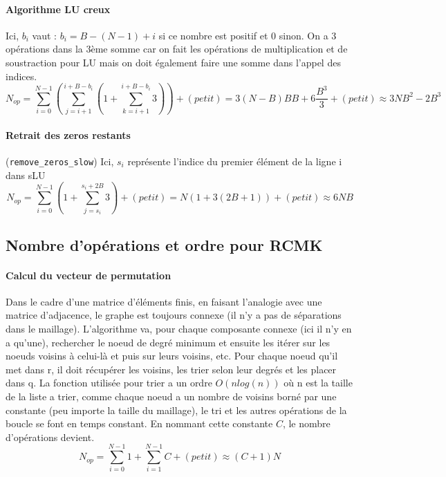 \documentclass[11pt]{article}
\begin{document}
\paragraph{Algorithme LU creux} Ici, $b_i$ vaut : $b_i = B - (N - 1) + i$ si ce nombre est positif et 0 sinon. On a 3 opérations dans la 3ème somme car on fait les opérations de multiplication et de soustraction pour LU mais on doit également faire une somme dans l'appel des indices. 
\begin{equation}
    N_{op} = \sum_{i=0}^{N-1}\left(\sum_{j=i+1}^{i + B - b_i} \left( 1 + \sum_{k=i+1}^{i + B - b_i} 3\right)\right) + (petit) = 3(N-B)B B + 6\frac{B^3}{3}+ (petit) \approx 3NB^2 -  2B^3
\end{equation}\label{eq3}
\vspace{-15pt}
\paragraph{Retrait des zeros restants} (\texttt{remove\_zeros\_slow}) Ici, $s_i$ représente l'indice du premier élément de la ligne i dans sLU
\begin{equation}
    N_{op} = \sum_{i=0}^{N-1}\left( 1 + \sum_{j = s_i}^{s_i + 2B} 3\right) + (petit) = N(1 + 3(2B+1)) + (petit) \approx 6NB
\end{equation}\label{eq4}
\vspace{-15pt}

\subsection*{Nombre d'opérations et ordre pour RCMK}
\paragraph{Calcul du vecteur de permutation} Dans le cadre d'une matrice d'éléments finis, en faisant l'analogie avec une matrice d'adjacence, le graphe est toujours connexe (il n'y a pas de séparations dans le maillage). L'algorithme va, pour chaque composante connexe (ici il n'y en a qu'une), rechercher le noeud de degré minimum et ensuite les itérer sur les noeuds voisins à celui-là et puis sur leurs voisins, etc. Pour chaque noeud qu'il met dans r, il doit récupérer les voisins, les trier selon leur degrés et les placer dans q. La fonction utilisée pour trier a un ordre $O(nlog(n))$ où n est la taille de la liste a trier, comme chaque noeud a un nombre de voisins borné par une constante (peu importe la taille du maillage), le tri et les autres opérations de la boucle se font en temps constant. En nommant cette constante $C$, le nombre d'opérations devient.
\begin{equation}
    N_{op} = \sum_{i = 0}^{N-1} 1 + \sum_{i = 1}^{N-1} C + (petit) \approx (C+1)N
\end{equation}
\vspace{-15pt}
\end{document}
